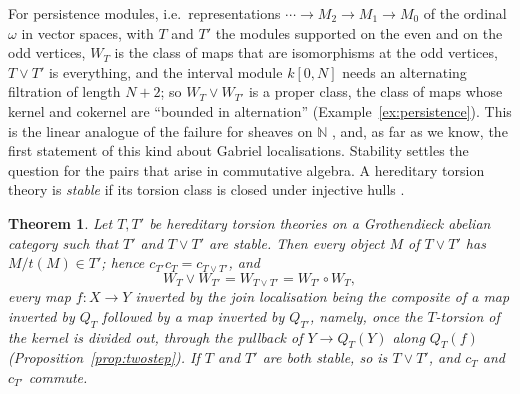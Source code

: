 \documentclass[11pt]{amsart}
\newtheorem{thm}{Theorem}[section]
\theoremstyle{definition}
\begin{document}
For persistence modules, i.e.\ representations $\cdots\to M_2\to M_1\to M_0$
of the ordinal $\omega$ in vector spaces, with $T$ and $T'$ the modules
supported on the even and on the odd vertices, $W_T$ is the class of maps
that are isomorphisms at the odd vertices, $T\vee T'$ is everything, and the
interval module $k[0,N]$ needs an alternating filtration of length $N+2$;
so $W_T\vee W_{T'}$ is a proper class, the class of maps whose kernel and
cokernel are ``bounded in alternation'' (Example~\ref{ex:persistence}). This
is the linear analogue of the failure for sheaves on $\mathbb N$
\cite{Topjoin}, and, as far as we know, the first statement of this kind
about Gabriel localisations. Stability settles the question for the pairs
that arise in commutative algebra. A hereditary torsion theory is
\emph{stable} if its torsion class is closed under injective hulls
\cite[Ch.~VI, \S7]{Stenstrom}.

\begin{thm}\label{thm:stable}
Let $T,T'$ be hereditary torsion theories on a Grothendieck abelian category
such that $T'$ and $T\vee T'$ are stable. Then every object $M$ of $T\vee T'$
has $M/t(M)\in T'$; hence $c_{T'}c_T=c_{T\vee T'}$, and
\[
W_T\vee W_{T'}=W_{T\vee T'}=W_{T'}\circ W_T,
\]
every map $f\colon X\to Y$ inverted by the join localisation being the
composite of a map inverted by $Q_T$ followed by a map inverted by $Q_{T'}$,
namely, once the $T$-torsion of the kernel is divided out, through the
pullback of $Y\to Q_T(Y)$ along $Q_T(f)$ (Proposition~\ref{prop:twostep}). If $T$ and $T'$ are both stable, so is
$T\vee T'$, and $c_T$ and $c_{T'}$ commute.
\end{thm}
\end{document}
